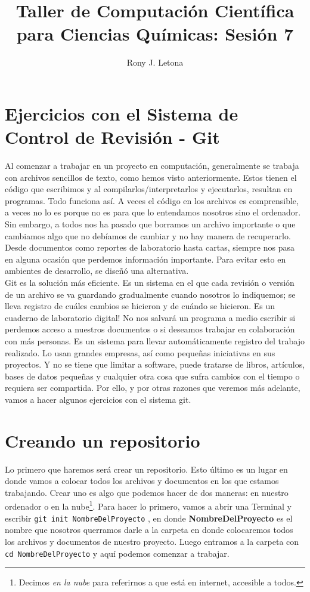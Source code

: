 \documentclass[10pt,letterpaper]{article}
\author{Rony J. Letona}
\title{Taller de Computaci\'on Cient\'ifica para Ciencias Qu\'imicas: Sesi\'on 7}
\newcommand{\inlinecode}[1]{
\colorbox{light-gray}{\texttt{#1}}
}
\begin{document}
\maketitle

\section{Ejercicios con el Sistema de Control de Revisi\'on - Git}
Al comenzar a trabajar en un proyecto en computaci\'on, generalmente se trabaja con archivos sencillos de texto, como hemos visto anteriormente. Estos tienen el c\'odigo que escribimos y al compilarlos/interpretarlos y ejecutarlos, resultan en programas. Todo funciona as\'i. A veces el c\'odigo en los archivos es comprensible, a veces no lo es porque no es para que lo entendamos nosotros sino el ordenador. Sin embargo, a todos nos ha pasado que borramos un archivo importante o que cambiamos algo que no deb\'iamos de cambiar y no hay manera de recuperarlo. Desde documentos como reportes de laboratorio hasta cartas, siempre nos pasa en alguna ocasi\'on que perdemos informaci\'on importante. Para evitar esto en ambientes de desarrollo, se dise\~n\'o una alternativa.\\

Git es la soluci\'on m\'as eficiente. Es un sistema en el que cada revisi\'on o versi\'on de un archivo se va guardando gradualmente cuando nosotros lo indiquemos; se lleva registro de cu\'ales cambios se hicieron y de cu\'ando se hicieron. Es un cuaderno de laboratorio digital! No nos salvar\'a un programa a medio escribir si perdemos acceso a nuestros documentos o si deseamos trabajar en colaboraci\'on con m\'as personas. Es un sistema para llevar autom\'aticamente registro del trabajo realizado. Lo usan grandes empresas, as\'i como peque\~nas iniciativas en sus proyectos. Y no se tiene que limitar a software, puede tratarse de libros, art\'iculos, bases de datos peque\~nas y cualquier otra cosa que sufra cambios con el tiempo o requiera ser compartida. Por ello, y por otras razones que veremos m\'as adelante, vamos a hacer algunos ejercicios con el sistema git.

\section{Creando un repositorio}
Lo primero que haremos ser\'a crear un repositorio. Esto \'ultimo es un lugar en donde vamos a colocar todos los archivos y documentos en los que estamos trabajando. Crear uno es algo que podemos hacer de dos maneras: en nuestro ordenador o en la nube\footnote{Decimos \emph{en la nube} para referirnos a que est\'a en internet, accesible a todos.}. Para hacer lo primero, vamos a abrir una Terminal y escribir \inlinecode{git init NombreDelProyecto}, en donde \textbf{NombreDelProyecto} es el nombre que nosotros querramos darle a la carpeta en donde colocaremos todos los archivos y documentos de nuestro proyecto. Luego entramos a la carpeta con \inlinecode{cd NombreDelProyecto} y aqu\'i podemos comenzar a trabajar.\\
\end{document}
